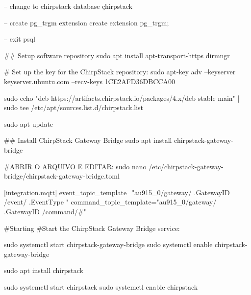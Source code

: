 -- change to chirpstack database
\c chirpstack

-- create pg_trgm extension
create extension pg_trgm;

-- exit psql
\q


## Setup software repository
sudo apt install apt-transport-https dirmngr


# Set up the key for the ChirpStack repository:
sudo apt-key adv --keyserver keyserver.ubuntu.com --recv-keys 1CE2AFD36DBCCA00

sudo echo "deb https://artifacts.chirpstack.io/packages/4.x/deb stable main" | sudo tee /etc/apt/sources.list.d/chirpstack.list

sudo apt update


## Install ChirpStack Gateway Bridge
sudo apt install chirpstack-gateway-bridge

#ABRIR O ARQUIVO E EDITAR:
sudo nano /etc/chirpstack-gateway-bridge/chirpstack-gateway-bridge.toml


[integration.mqtt]
event_topic_template="au915_0/gateway/{{ .GatewayID }}/event/{{ .EventType }}"
command_topic_template="au915_0/gateway/{{ .GatewayID }}/command/#"


#Starting
#Start the ChirpStack Gateway Bridge service:

sudo systemctl start chirpstack-gateway-bridge
sudo systemctl enable chirpstack-gateway-bridge

sudo apt install chirpstack

sudo systemctl start chirpstack
sudo systemctl enable chirpstack



